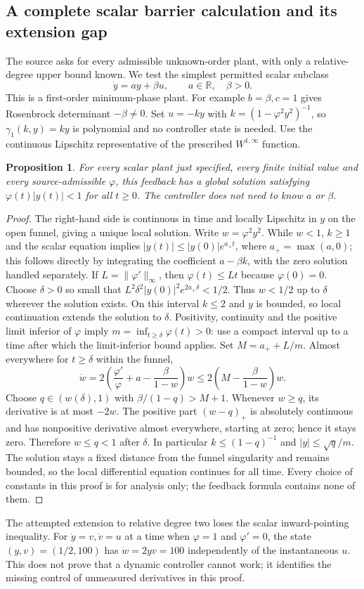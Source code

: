 \documentclass[11pt]{article}
\newtheorem{proposition}{Proposition}
\begin{document}
\subsection{A complete scalar barrier calculation and its extension gap}
The source asks for every admissible unknown-order plant, with only a relative-degree upper bound known. We test the simplest permitted scalar subclass
\[
\dot y=ay+\beta u,\qquad a\in\mathbb R,\quad\beta>0.
\]
This is a first-order minimum-phase plant. For example $b=\beta,c=1$ gives Rosenbrock determinant $-\beta\ne0$. Set $u=-ky$ with $k=(1-\varphi^2y^2)^{-1}$, so $\gamma_1(k,y)=ky$ is polynomial and no controller state is needed. Use the continuous Lipschitz representative of the prescribed $W^{1,\infty}$ function.
\begin{proposition}
For every scalar plant just specified, every finite initial value and every source-admissible $\varphi$, this feedback has a global solution satisfying $\varphi(t)|y(t)|<1$ for all $t\ge0$. The controller does not need to know $a$ or $\beta$.
\end{proposition}
\begin{proof}
The right-hand side is continuous in time and locally Lipschitz in $y$ on the open funnel, giving a unique local solution. Write $w=\varphi^2y^2$. While $w<1$, $k\ge1$ and the scalar equation implies $|y(t)|\le |y(0)|e^{a_+t}$, where $a_+=\max(a,0)$; this follows directly by integrating the coefficient $a-\beta k$, with the zero solution handled separately. If $L=\|\varphi'\|_\infty$, then $\varphi(t)\le Lt$ because $\varphi(0)=0$. Choose $\delta>0$ so small that $L^2\delta^2|y(0)|^2e^{2a_+\delta}<1/2$. Thus $w<1/2$ up to $\delta$ wherever the solution exists. On this interval $k\le2$ and $y$ is bounded, so local continuation extends the solution to $\delta$.
Positivity, continuity and the positive limit inferior of $\varphi$ imply
$m=\inf_{t\ge\delta}\varphi(t)>0$: use a compact interval up to a time after which the limit-inferior bound applies. Set $M=a_++L/m$. Almost everywhere for $t\ge\delta$ within the funnel,
\[
\dot w=2\left(\frac{\varphi'}{\varphi}+a-\frac{\beta}{1-w}\right)w
\le2\left(M-\frac{\beta}{1-w}\right)w.
\]
Choose $q\in(w(\delta),1)$ with $\beta/(1-q)>M+1$. Whenever $w\ge q$, its derivative is at most $-2w$. The positive part $(w-q)_+$ is absolutely continuous and has nonpositive derivative almost everywhere, starting at zero; hence it stays zero. Therefore $w\le q<1$ after $\delta$. In particular $k\le(1-q)^{-1}$ and $|y|\le\sqrt q/m$. The solution stays a fixed distance from the funnel singularity and remains bounded, so the local differential equation continues for all time. Every choice of constants in this proof is for analysis only; the feedback formula contains none of them.
\end{proof}
The attempted extension to relative degree two loses the scalar inward-pointing inequality. For $\dot y=v,\dot v=u$ at a time when $\varphi=1$ and $\varphi'=0$, the state $(y,v)=(1/2,100)$ has $\dot w=2yv=100$ independently of the instantaneous $u$. This does not prove that a dynamic controller cannot work; it identifies the missing control of unmeasured derivatives in this proof.
\end{document}
